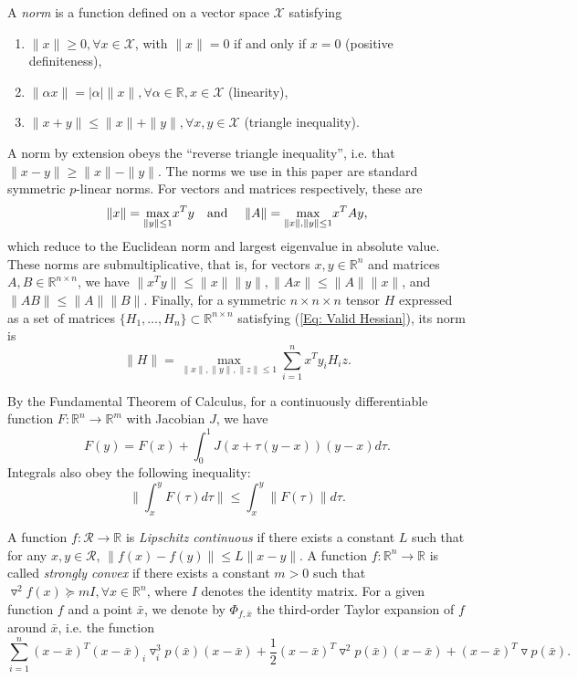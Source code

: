 \documentclass[11pt]{article}
\theoremstyle{plain}
\theoremstyle{definition}
\theoremstyle{remark}
\def \xbar{\bar{x}}
\def \grad{\triangledown}
\def \Hess{\triangledown^2}
\def \R{\mathbb{R}}
\def \Rn{\R^n}
\begin{document}
A \emph{norm} is a function defined on a vector space $\mathcal{X}$ satisfying
\begin{enumerate}
    \item $\|x\| \ge 0, \forall x \in \mathcal{X}$, with $\|x\| = 0$ if and only if $x = 0$ (positive definiteness),
    \item $\|\alpha x\| = |\alpha| \|x\|, \forall \alpha \in \R, x \in \mathcal{X}$ (linearity),
    \item $\|x + y\| \le \|x\| + \|y\|, \forall x,y \in \mathcal{X}$ (triangle inequality).
\end{enumerate}
A norm by extension obeys the ``reverse triangle inequality'', i.e. that $\|x - y\| \ge \|x\| - \|y\|$. The norms we use in this paper are standard symmetric $p$-linear norms. For vectors and matrices respectively, these are
$$\|x\| = \underset{\|y\| \le 1}{\max} x^Ty \text{\quad and \quad}\|A\| = \underset{\|x\|,\|y\| \le 1}{\max} x^TAy,$$
which reduce to the Euclidean norm and largest eigenvalue in absolute value. These norms are submultiplicative, that is, for vectors $x,y \in \Rn$ and matrices $A, B \in \R^{n \times n}$, we have $\|x^Ty\| \le \|x\|\|y\|, \|Ax\| \le \|A\|\|x\|$, and $\|AB\| \le \|A\|\|B\|$. Finally, for a symmetric $n \times n \times n$ tensor $H$ expressed as a set of matrices $\{H_1, \dots, H_n\} \subset \R^{n \times n}$ satisfying (\ref{Eq: Valid Hessian}), its norm is
\begin{equation}
    \|H\| = \underset{\|x\|, \|y\|, \|z\|\le 1}{\max} \sum_{i=1}^n x^Ty_iH_iz.
\end{equation}

By the Fundamental Theorem of Calculus, for a continuously differentiable function $F: \R^n \to \R^m$ with Jacobian $J$, we have
$$F(y) = F(x) + \int_0^1 J(x + \tau (y -x))(y -x)d\tau.$$
Integrals also obey the following inequality:
$$\|\int_x^y F(\tau)d\tau\| \le \int_x^y \|F(\tau)\|d\tau.$$

A function $f: \mathcal{R} \to \R$ is \emph{Lipschitz continuous} if there exists a constant $L$ such that for any $x, y \in \mathcal{R}$, $\|f(x) - f(y)\| \le L\|x-y\|$. A function $f: \Rn \to \R$ is called \emph{strongly convex} if there exists a constant $m > 0$ such that $\Hess f(x) \succeq mI, \forall x \in \Rn$, where $I$ denotes the identity matrix. For a given function $f$ and a point $\xbar$, we denote by $\Phi_{f,\xbar}$ the third-order Taylor expansion of $f$ around $\xbar$, i.e. the function
$$\sum_{i=1}^n (x-\xbar)^T (x-\xbar)_i \grad_i^3 p(\xbar) (x-\xbar) + \frac{1}{2} (x-\xbar)^T \grad^2 p(\xbar) (x-\xbar) + (x-\xbar)^T\grad p(\xbar).$$
\end{document}
